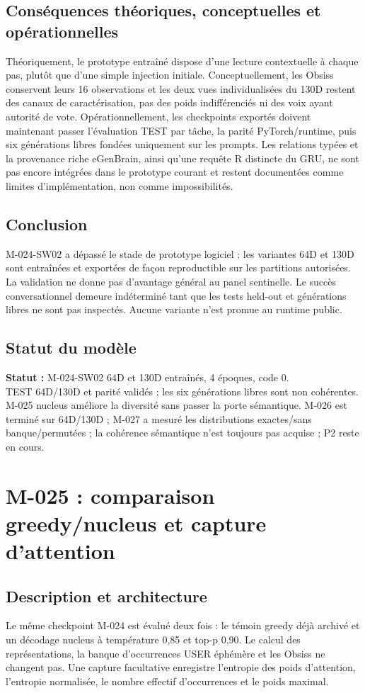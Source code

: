\documentclass[11pt,a4paper]{report}
\begin{document}
\subsection*{Conséquences théoriques, conceptuelles et opérationnelles}
Théoriquement, le prototype entraîné dispose d'une lecture contextuelle à chaque pas, plutôt que d'une simple injection initiale. Conceptuellement, les Obsiss conservent leurs 16 observations et les deux vues individualisées du 130D restent des canaux de caractérisation, pas des poids indifférenciés ni des voix ayant autorité de vote. Opérationnellement, les checkpoints exportés doivent maintenant passer l'évaluation TEST par tâche, la parité PyTorch/runtime, puis six générations libres fondées uniquement sur les prompts. Les relations typées et la provenance riche eGenBrain, ainsi qu'une requête R distincte du GRU, ne sont pas encore intégrées dans le prototype courant et restent documentées comme limites d'implémentation, non comme impossibilités.

\subsection*{Conclusion}
M-024-SW02 a dépassé le stade de prototype logiciel : les variantes 64D et 130D sont entraînées et exportées de façon reproductible sur les partitions autorisées. La validation ne donne pas d'avantage général au panel sentinelle. Le succès conversationnel demeure indéterminé tant que les tests held-out et générations libres ne sont pas inspectés. Aucune variante n'est promue au runtime public.

\subsection*{Statut du modèle}
\textbf{Statut :} M-024-SW02 64D et 130D entraînés, 4 époques, code 0.\\
TEST 64D/130D et parité validés ; les six générations libres sont non cohérentes. M-025 nucleus améliore la diversité sans passer la porte sémantique. M-026 est terminé sur 64D/130D ; M-027 a mesuré les distributions exactes/sans banque/permutées ; la cohérence sémantique n’est toujours pas acquise ; P2 reste en cours.


\section{M-025 : comparaison greedy/nucleus et capture d'attention}
\subsection{Description et architecture}
Le même checkpoint M-024 est évalué deux fois : le témoin greedy déjà archivé et un décodage nucleus à température 0,85 et top-p 0,90. Le calcul des représentations, la banque d'occurrences USER éphémère et les Obsiss ne changent pas. Une capture facultative enregistre l'entropie des poids d'attention, l'entropie normalisée, le nombre effectif d'occurrences et le poids maximal.
\end{document}
